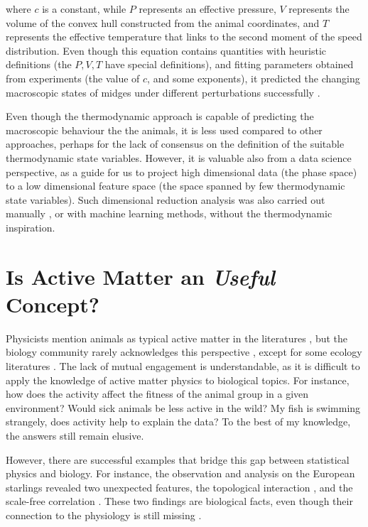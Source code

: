 \documentclass[11pt,twoside]{report}
\begin{document}
\noindent where $c$ is a constant, while $P$ represents an effective pressure, $V$ represents the volume of the convex hull constructed from the animal coordinates, and $T$ represents the effective temperature that links to the second moment of the speed distribution.
Even though this equation contains quantities with heuristic definitions (the $P, V, T$ have special definitions), and fitting parameters obtained from experiments (the value of $c$, and some exponents), it  predicted the changing macroscopic states of midges under different perturbations successfully \cite{sinhuber2021}.

Even though the thermodynamic approach is capable of predicting the macroscopic behaviour the the animals, it is less used compared to other approaches, perhaps for the lack of consensus on the definition of the suitable thermodynamic state variables.
However, it is valuable also from a data science perspective, as a guide for us to project high dimensional data (the phase space) to a low dimensional feature space (the space spanned by few thermodynamic state variables). Such dimensional reduction analysis was also carried out manually \cite{yang2021pcb}, or with machine learning methods\cite{tang2020}, without the thermodynamic inspiration.

\section{Is Active Matter an \emph{Useful} Concept?}
\label{section:intro-benefit}

Physicists mention animals as typical active matter in the literatures \cite{reynolds1987, vicsek1995, chate2008EPJ, chen2015, kürsten2021}, but the biology community rarely acknowledges this perspective \cite{ouellette2022}, except for some ecology literatures \cite{guttal2012, tang2020}. The lack of mutual engagement is understandable, as it is difficult to apply the knowledge of active matter physics to biological topics. For instance, how does the activity affect the fitness of the animal group in a given environment? Would sick animals be less active in the wild? My fish is swimming strangely, does activity help to explain the data? To the best of my knowledge, the answers still remain elusive.

However, there are successful examples that bridge this gap between statistical physics and biology.
For instance, the observation and analysis on the European starlings revealed two unexpected features, the topological interaction \cite{ballerini2008pnas}, and the scale-free correlation \cite{cavagna2010}. These two findings are biological facts, even though their connection to the physiology is still missing \cite{ouellette2022}.
\end{document}

